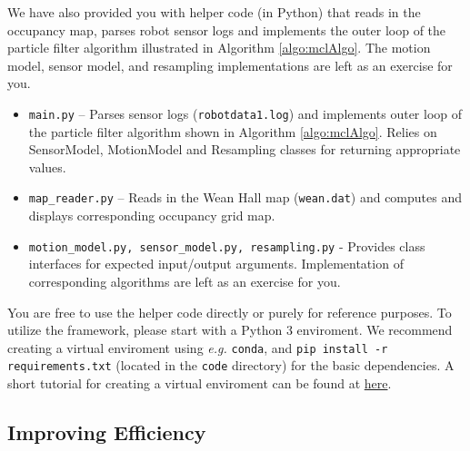\documentclass[12pt, a4paper]{article}
\begin{document}
We have also provided you with helper code (in Python) that reads
in the occupancy map, parses robot sensor logs and implements the
outer loop of the particle filter algorithm illustrated in Algorithm
\ref{algo:mclAlgo}. The motion model, sensor model, and resampling
implementations are left as an exercise for you. 
\begin{itemize}
\item \texttt{main.py} -- Parses sensor logs (\texttt{robotdata1.log})
and implements outer loop of the particle filter algorithm shown in
Algorithm \ref{algo:mclAlgo}. Relies on SensorModel, MotionModel
and Resampling classes for returning appropriate values.
\item \texttt{map\_reader.py} -- Reads in the Wean Hall map (\texttt{wean.dat})
and computes and displays corresponding occupancy grid map.
\item \texttt{motion\_model.py, sensor\_model.py, resampling.py} - Provides
class interfaces for expected input/output arguments. Implementation
of corresponding algorithms are left as an exercise for you.
\end{itemize}
You are free to use the helper code directly or purely for reference
purposes. To utilize the framework, please start with a Python 3 enviroment. We recommend creating a virtual enviroment 
using \emph{e.g.} \texttt{conda}, and \texttt{pip install -r requirements.txt} (located in the \texttt{code} directory) for the basic dependencies. A short tutorial for creating a virtual enviroment can be found at \href{https://docs.google.com/document/d/1iAuVGllpk3RMZzBl-kGaA2AlF8Jg5cs00y0ZwkOZ08E/edit}{here}.

\subsection*{Improving Efficiency}
\end{document}
